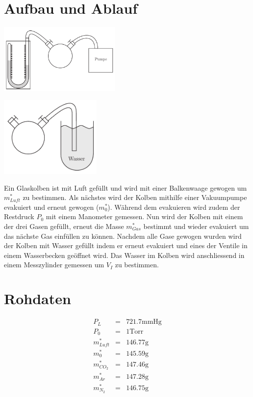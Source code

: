 \documentclass[12pt,a4paper]{article}
\begin{document}
\section*{Aufbau und Ablauf}
\begin{multicols}{2}
\includegraphics[width=6cm]{vakuum.pdf}

\includegraphics[width=5cm]{wasser.pdf}
\end{multicols}

\noindent
Ein Glaskolben ist mit Luft gefüllt und wird mit einer Balkenwaage gewogen um $m^*_{Luft}$ zu bestimmen. Als nächstes wird der Kolben mithilfe einer Vakuumpumpe evakuiert und erneut gewogen ($m^*_0$). Während dem evakuieren wird zudem der Restdruck $P_0$ mit einem Manometer gemessen. Nun wird der Kolben mit einem der drei Gasen gefüllt, erneut die Masse $m^*_{Gas}$ bestimmt und wieder evakuiert um das nächste Gas einfüllen zu können. Nachdem alle Gase gewogen wurden wird der Kolben mit Wasser gefüllt indem er erneut evakuiert und eines der Ventile in einem Wasserbecken geöffnet wird. Das Wasser im Kolben wird anschliessend in einem Messzylinder gemessen um $V_I$ zu bestimmen.

\section*{Rohdaten}
\begin{eqnarray*}
P_L & = & 721.7 \mbox{mmHg} \\
P_0 & = & 1 \mbox{Torr} \\
m^*_{Luft} & = & 146.77 \mbox{g} \\
m^*_{0} & = & 145.59 \mbox{g} \\
m^*_{CO_2} & = & 147.46 \mbox{g} \\
m^*_{Ar} & = & 147.28 \mbox{g} \\
m^*_{N_2} & = & 146.75\mbox{g} \\
\end{eqnarray*}
\end{document}
